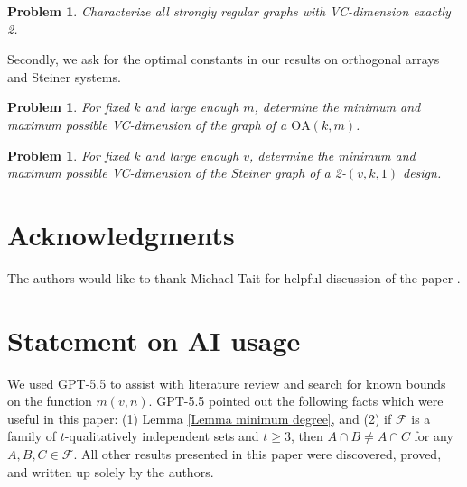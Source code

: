 \documentclass{article}
\newtheorem{prob}[thm]{Problem}
\theoremstyle{definition}
\begin{document}
\begin{prob}
    Characterize all strongly regular graphs with VC-dimension exactly 2.
\end{prob}

Secondly, we ask for the optimal constants in our results on orthogonal arrays and Steiner systems.

\begin{prob}
    For fixed $k$ and large enough $m$, determine the minimum and maximum possible VC-dimension of the graph of a $\mathrm{OA}(k,m)$.
\end{prob}

\begin{prob}
    For fixed $k$ and large enough $v$, determine the minimum and maximum possible VC-dimension of the Steiner graph of a 2-$(v,k,1)$ design.
\end{prob}


\section{Acknowledgments}
The authors would like to thank Michael Tait for helpful discussion of the paper \cite{pham2025vc}.


\section{Statement on AI usage}

We used GPT-5.5 to assist with literature review and search for known bounds on the function $m(v,n)$. GPT-5.5 pointed out the following facts which were useful in this paper: (1) Lemma \ref{Lemma minimum degree}, and (2) if $\mathcal F$ is a family of $t$-qualitatively independent sets and $t\ge 3$, then $A\cap B\ne A\cap C$ for any $A,B,C\in\mathcal F$. All other results presented in this paper were discovered, proved, and written up solely by the authors.

\printbibliography
\end{document}
